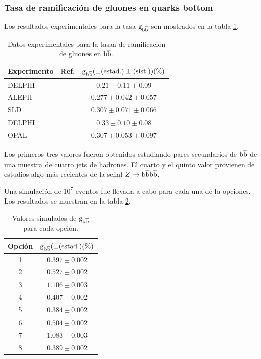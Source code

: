 \documentclass[a4paper,12pt]{article}
\begin{document}
\subsubsection{Tasa de ramificación de gluones en quarks bottom}

Los resultados experimentales para la tasa ${\mathrm g}_{{\mathrm b}\overline{\mathrm b}}$ son mostrados en la tabla \ref{table:gbbMeasurements}.

\begin{table}[!h]
\caption{Datos experimentales para la tasaa de ramificación de gluones en ${\mathrm b}\overline{\mathrm b}$.}\smallskip
\label{table:gbbMeasurements}
\centering 
\begin{tabular}{lcc}
\hline \hline  
\smallskip
Experimento & Ref. & ${\mathrm g}_{{\mathrm b}\overline{\mathrm b}} (\pm(\text{estad.})\pm(\text{sist.})) (\%)$ \\ 
\hline
DELPHI & \cite{Abreu:1997nf} &  $0.21\pm0.11\pm0.09$ \\
ALEPH & \cite{Barate:1998vs} & $0.277\pm0.042\pm0.057$ \\
SLD & \cite{Abe:1999qg} & $0.307\pm0.071\pm0.066$ \\
DELPHI & \cite{Abreu:1999qh} & $0.33\pm0.10\pm0.08$ \\
OPAL & \cite{Abbiendi:2000zt} & $0.307\pm0.053\pm0.097$ \\
\end{tabular}
\end{table}

Los primeros tres valores fueron obtenidos estudiando pares secundarios de ${\mathrm b}\overline{\mathrm b}$ de una muestra de cuatro jets de hadrones. El cuarto y el quinto valor provienen de estudios algo más recientes de la señal $Z\to{\mathrm b}\overline{\mathrm b}{\mathrm b}\overline{\mathrm b}$.

Una simulación de $10^7$ eventos fue llevada a cabo para cada una de la opciones. Los resultados se muestran en la tabla \ref{table:gbbResults}.


\begin{table}[!h]
\caption{Valores simulados de ${\mathrm g}_{{\mathrm b}\overline{\mathrm b}}$ para cada opción.}\smallskip
\label{table:gbbResults}
\centering 
\begin{tabular}{cc}
\hline \hline  
\smallskip
Opción & ${\mathrm g}_{{\mathrm b}\overline{\mathrm b}} (\pm(\text{estad.}) (\%)$ \\ 
\hline
1 &  $0.397\pm0.002$ \\
2 &  $0.527\pm0.002$ \\
3 &  $1.106\pm0.003$ \\
4 &  $0.407\pm0.002$ \\
5 &  $0.384\pm0.002$ \\
6 &  $0.504\pm0.002$ \\
7 &  $1.083\pm0.003$ \\
8 &  $0.389\pm0.002$ \\

\end{tabular}
\end{table}
\end{document}
